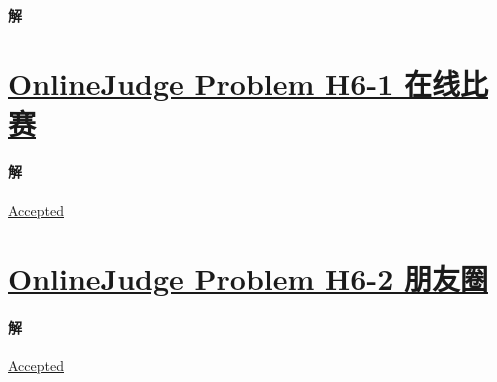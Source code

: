 \documentclass{article}
\newcommand{\SetHrefColor}[1]{
	\hypersetup{urlcolor=#1}
}
\begin{document}
\paragraph{解}


\section{\href{https://202.38.86.171/problem/H6-1}{OnlineJudge Problem H6-1 在线比赛}}

\SetHrefColor{blue!30!green}

\paragraph{解}
\href{https://202.38.86.171/status/829aee86f921ebd694c0d52303582a55}{\underline{Accepted}}

\SetHrefColor{black}
\section{\href{https://202.38.86.171/problem/H6-1}{OnlineJudge Problem H6-2 朋友圈}}
\SetHrefColor{blue!30!green}
\paragraph{解}
\href{https://202.38.86.171/status/7ea7548feef36a762b4a53e940d47aba}{\underline{Accepted}}
\end{document}
